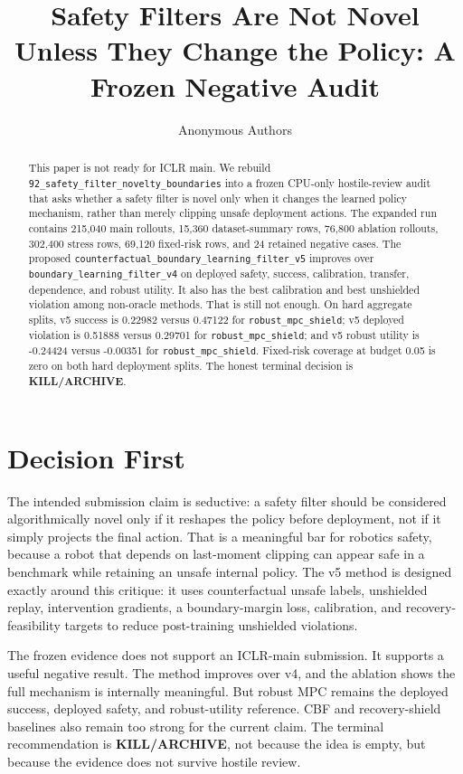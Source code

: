 \documentclass{article}
\title{Safety Filters Are Not Novel Unless They Change the Policy: A Frozen Negative Audit}
\author{Anonymous Authors}
\begin{document}
\maketitle

\begin{abstract}
This paper is not ready for ICLR main. We rebuild \texttt{92\_safety\_filter\_novelty\_boundaries} into a frozen CPU-only hostile-review audit that asks whether a safety filter is novel only when it changes the learned policy mechanism, rather than merely clipping unsafe deployment actions. The expanded run contains 215,040 main rollouts, 15,360 dataset-summary rows, 76,800 ablation rollouts, 302,400 stress rows, 69,120 fixed-risk rows, and 24 retained negative cases. The proposed \texttt{counterfactual\_boundary\_learning\_filter\_v5} improves over \texttt{boundary\_learning\_filter\_v4} on deployed safety, success, calibration, transfer, dependence, and robust utility. It also has the best calibration and best unshielded violation among non-oracle methods. That is still not enough. On hard aggregate splits, v5 success is 0.22982 versus 0.47122 for \texttt{robust\_mpc\_shield}; v5 deployed violation is 0.51888 versus 0.29701 for \texttt{robust\_mpc\_shield}; and v5 robust utility is -0.24424 versus -0.00351 for \texttt{robust\_mpc\_shield}. Fixed-risk coverage at budget 0.05 is zero on both hard deployment splits. The honest terminal decision is \textbf{KILL/ARCHIVE}.
\end{abstract}

\section{Decision First}
The intended submission claim is seductive: a safety filter should be considered algorithmically novel only if it reshapes the policy before deployment, not if it simply projects the final action. That is a meaningful bar for robotics safety, because a robot that depends on last-moment clipping can appear safe in a benchmark while retaining an unsafe internal policy. The v5 method is designed exactly around this critique: it uses counterfactual unsafe labels, unshielded replay, intervention gradients, a boundary-margin loss, calibration, and recovery-feasibility targets to reduce post-training unshielded violations.

The frozen evidence does not support an ICLR-main submission. It supports a useful negative result. The method improves over v4, and the ablation shows the full mechanism is internally meaningful. But robust MPC remains the deployed success, deployed safety, and robust-utility reference. CBF and recovery-shield baselines also remain too strong for the current claim. The terminal recommendation is \textbf{KILL/ARCHIVE}, not because the idea is empty, but because the evidence does not survive hostile review.
\end{document}
